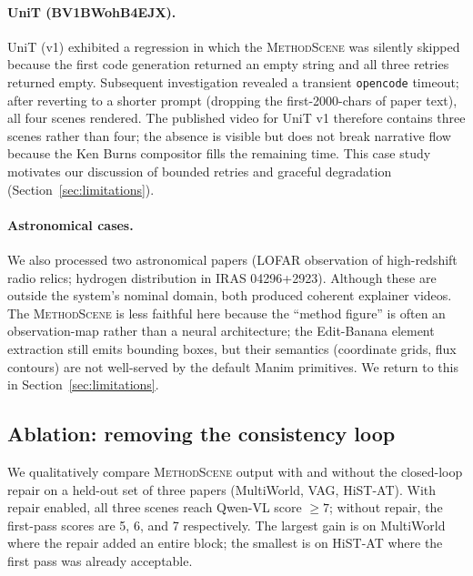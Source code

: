\documentclass[11pt,a4paper]{article}
\begin{document}
\paragraph{UniT (BV1BWohB4EJX).}
UniT (v1) exhibited a regression in which the \textsc{MethodScene} was silently skipped because the first code generation returned an empty string and all three retries returned empty. Subsequent investigation revealed a transient \texttt{opencode} timeout; after reverting to a shorter prompt (dropping the first-2000-chars of paper text), all four scenes rendered. The published video for UniT v1 therefore contains three scenes rather than four; the absence is visible but does not break narrative flow because the Ken Burns compositor fills the remaining time. This case study motivates our discussion of bounded retries and graceful degradation (Section~\ref{sec:limitations}).

\paragraph{Astronomical cases.}
We also processed two astronomical papers (LOFAR observation of high-redshift radio relics; hydrogen distribution in IRAS 04296+2923). Although these are outside the system's nominal domain, both produced coherent explainer videos. The \textsc{MethodScene} is less faithful here because the ``method figure'' is often an observation-map rather than a neural architecture; the Edit-Banana element extraction still emits bounding boxes, but their semantics (coordinate grids, flux contours) are not well-served by the default Manim primitives. We return to this in Section~\ref{sec:limitations}.

\subsection{Ablation: removing the consistency loop}

We qualitatively compare \textsc{MethodScene} output with and without the closed-loop repair on a held-out set of three papers (MultiWorld, VAG, HiST-AT). With repair enabled, all three scenes reach Qwen-VL score $\ge 7$; without repair, the first-pass scores are 5, 6, and 7 respectively. The largest gain is on MultiWorld where the repair added an entire block; the smallest is on HiST-AT where the first pass was already acceptable. %

\end{document}
